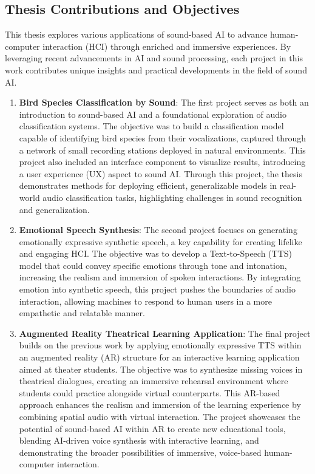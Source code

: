 \subsection{Thesis Contributions and Objectives}
This thesis explores various applications of sound-based AI to advance human-computer interaction (HCI) through enriched and immersive experiences. By leveraging recent advancements in AI and sound processing, each project in this work contributes unique insights and practical developments in the field of sound AI.

\begin{enumerate}
\item \textbf{Bird Species Classification by Sound}: The first project serves as both an introduction to sound-based AI and a foundational exploration of audio classification systems. The objective was to build a classification model capable of identifying bird species from their vocalizations, captured through a network of small recording stations deployed in natural environments. This project also included an interface component to visualize results, introducing a user experience (UX) aspect to sound AI. Through this project, the thesis demonstrates methods for deploying efficient, generalizable models in real-world audio classification tasks, highlighting challenges in sound recognition and generalization.

\item \textbf{Emotional Speech Synthesis}: The second project focuses on generating emotionally expressive synthetic speech, a key capability for creating lifelike and engaging HCI. The objective was to develop a Text-to-Speech (TTS) model that could convey specific emotions through tone and intonation, increasing the realism and immersion of spoken interactions. By integrating emotion into synthetic speech, this project pushes the boundaries of audio interaction, allowing machines to respond to human users in a more empathetic and relatable manner.

\item \textbf{Augmented Reality Theatrical Learning Application}: The final project builds on the previous work by applying emotionally expressive TTS within an augmented reality (AR) structure for an interactive learning application aimed at theater students. The objective was to synthesize missing voices in theatrical dialogues, creating an immersive rehearsal environment where students could practice alongside virtual counterparts. This AR-based approach enhances the realism and immersion of the learning experience by combining spatial audio with virtual interaction. The project showcases the potential of sound-based AI within AR to create new educational tools, blending AI-driven voice synthesis with interactive learning, and demonstrating the broader possibilities of immersive, voice-based human-computer interaction.
\end{enumerate}
